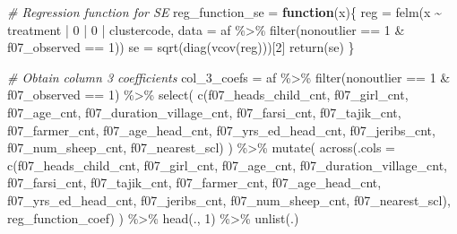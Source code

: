 \documentclass[
]{article}
\newenvironment{Shaded}{\begin{snugshade}}{\end{snugshade}}
\newcommand{\AttributeTok}[1]{\textcolor[rgb]{0.77,0.63,0.00}{#1}}
\newcommand{\CommentTok}[1]{\textcolor[rgb]{0.56,0.35,0.01}{\textit{#1}}}
\newcommand{\ControlFlowTok}[1]{\textcolor[rgb]{0.13,0.29,0.53}{\textbf{#1}}}
\newcommand{\DecValTok}[1]{\textcolor[rgb]{0.00,0.00,0.81}{#1}}
\newcommand{\FunctionTok}[1]{\textcolor[rgb]{0.00,0.00,0.00}{#1}}
\newcommand{\NormalTok}[1]{#1}
\newcommand{\OtherTok}[1]{\textcolor[rgb]{0.56,0.35,0.01}{#1}}
\newcommand{\SpecialCharTok}[1]{\textcolor[rgb]{0.00,0.00,0.00}{#1}}
\begin{document}
\begin{Shaded}
\begin{Highlighting}[]
\CommentTok{\# Regression function for SE}
\NormalTok{reg\_function\_se }\OtherTok{=} \ControlFlowTok{function}\NormalTok{(x)\{}
\NormalTok{  reg }\OtherTok{=} \FunctionTok{felm}\NormalTok{(x }\SpecialCharTok{\textasciitilde{}}\NormalTok{ treatment }\SpecialCharTok{|} \DecValTok{0} \SpecialCharTok{|} \DecValTok{0} \SpecialCharTok{|}\NormalTok{ clustercode, }
             \AttributeTok{data =}\NormalTok{ af }\SpecialCharTok{\%\textgreater{}\%} \FunctionTok{filter}\NormalTok{(nonoutlier }\SpecialCharTok{==} \DecValTok{1} \SpecialCharTok{\&}\NormalTok{ f07\_observed }\SpecialCharTok{==} \DecValTok{1}\NormalTok{))}
\NormalTok{  se }\OtherTok{=} \FunctionTok{sqrt}\NormalTok{(}\FunctionTok{diag}\NormalTok{(}\FunctionTok{vcov}\NormalTok{(reg)))[}\DecValTok{2}\NormalTok{]}
  \FunctionTok{return}\NormalTok{(se)}
\NormalTok{\}}



\CommentTok{\# Obtain column 3 coefficients}
\NormalTok{col\_3\_coefs }\OtherTok{=}\NormalTok{ af }\SpecialCharTok{\%\textgreater{}\%} 
  \FunctionTok{filter}\NormalTok{(nonoutlier }\SpecialCharTok{==} \DecValTok{1} \SpecialCharTok{\&}\NormalTok{ f07\_observed }\SpecialCharTok{==} \DecValTok{1}\NormalTok{) }\SpecialCharTok{\%\textgreater{}\%} 
  \FunctionTok{select}\NormalTok{(}
    \FunctionTok{c}\NormalTok{(f07\_heads\_child\_cnt, f07\_girl\_cnt, f07\_age\_cnt, f07\_duration\_village\_cnt,}
\NormalTok{                   f07\_farsi\_cnt,  f07\_tajik\_cnt,  f07\_farmer\_cnt, }
\NormalTok{                   f07\_age\_head\_cnt, f07\_yrs\_ed\_head\_cnt, f07\_jeribs\_cnt, }
\NormalTok{                   f07\_num\_sheep\_cnt, f07\_nearest\_scl)}
\NormalTok{  ) }\SpecialCharTok{\%\textgreater{}\%} 
  \FunctionTok{mutate}\NormalTok{(}
  \FunctionTok{across}\NormalTok{(}\AttributeTok{.cols =} \FunctionTok{c}\NormalTok{(f07\_heads\_child\_cnt, f07\_girl\_cnt, f07\_age\_cnt, f07\_duration\_village\_cnt,}
\NormalTok{                   f07\_farsi\_cnt,  f07\_tajik\_cnt,  f07\_farmer\_cnt, }
\NormalTok{                   f07\_age\_head\_cnt, f07\_yrs\_ed\_head\_cnt, f07\_jeribs\_cnt, }
\NormalTok{                   f07\_num\_sheep\_cnt, f07\_nearest\_scl), reg\_function\_coef)}
\NormalTok{  ) }\SpecialCharTok{\%\textgreater{}\%} \FunctionTok{head}\NormalTok{(., }\DecValTok{1}\NormalTok{) }\SpecialCharTok{\%\textgreater{}\%} \FunctionTok{unlist}\NormalTok{(.)}


\end{Highlighting}
\end{Shaded}
\end{document}
